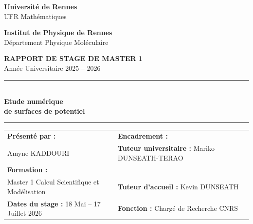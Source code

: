 \documentclass[11pt, a4paper, openany]{report}
\begin{document}
\begin{titlepage}
  \centering
  
  \begin{minipage}{0.45\textwidth}
    \begin{flushleft}
      \textbf{Université de Rennes}\\
      {\small UFR Mathématiques}
    \end{flushleft}
  \end{minipage}
  \hfill
  \begin{minipage}{0.45\textwidth}
    \begin{flushright}
      \textbf{Institut de Physique de Rennes}\\
      {\small Département Physique Moléculaire}
    \end{flushright}
  \end{minipage}

  \vfill

  {\Large \sffamily \bfseries \color{accent} RAPPORT DE STAGE DE MASTER 1}\\[0.5em]
  {\large \sffamily Année Universitaire 2025 -- 2026}

  \vspace{1.5cm}

  \rule{\textwidth}{1.5pt}\\[0.8em]
  {\huge \bfseries \color{primary} Etude numérique \\ de surfaces de potentiel}\\[0.5em]
  \rule{\textwidth}{1.5pt}

  \vfill

  \begin{minipage}{\textwidth}
    \begin{tabularx}{\textwidth}{@{} X X @{}}
      \textbf{Présenté par :} & \textbf{Encadrement :} \\[0.3em]
      \small Amyne KADDOURI & \textbf{Tuteur universitaire :} Mariko DUNSEATH-TERAO  \\
      \small \textbf{Formation :} &\\
      \small Master 1 Calcul Scientifique et Modélisation & \textbf{Tuteur d'accueil :} Kevin DUNSEATH \\
      \small \textbf{Dates du stage :} 18 Mai -- 17 Juillet 2026 & \small \textbf{Fonction :} Chargé de Recherche CNRS \\
    \end{tabularx}
  \end{minipage}

  \vfill


\end{titlepage}
\end{document}
